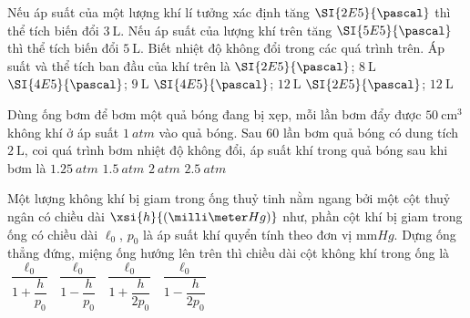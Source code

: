 \begin{ex}
Nếu áp suất của một lượng khí lí tưởng xác định tăng $\SI{2E5}{\pascal}$ thì thể tích biến đổi $\SI{3}{\liter}$. Nếu áp suất của lượng khí trên tăng $\SI{5E5}{\pascal}$ thì thể tích biến đổi $\SI{5}{\liter}$. Biết nhiệt độ không đổi trong các quá trình trên. Áp suất và thể tích ban đầu của khí trên là	
	\choice
	{$\SI{2E5}{\pascal}$; $\SI{8}{\liter}$}
	{\True $\SI{4E5}{\pascal}$; $\SI{9}{\liter}$}
	{$\SI{4E5}{\pascal}$; $\SI{12}{\liter}$}
	{$\SI{2E5}{\pascal}$; $\SI{12}{\liter}$}
\end{ex}
\begin{ex}
Dùng ống bơm để bơm một quả bóng đang bị xẹp, mỗi lần bơm đẩy được $\SI{50}{\centi\meter^3}$ không khí ở áp suất $\SI{1}{atm}$ vào quả bóng. Sau 60 lần bơm quả bóng có dung tích $\SI{2}{\liter}$, coi quá trình bơm nhiệt độ không đổi, áp suất khí trong quả bóng sau khi bơm là	
	\choice
	{$\SI{1.25}{atm}$}
	{\True $\SI{1.5}{atm}$}
	{$\SI{2}{atm}$}
	{$\SI{2.5}{atm}$}
\end{ex}
\begin{ex}
Một lượng không khí bị giam trong ống thuỷ tinh nằm ngang bởi một cột thuỷ ngân có chiều dài $\xsi{h}{\left(\milli\meter Hg\right)}$ như, phần cột khí bị giam trong ống có chiều dài $\ell_0$, $p_0$ là áp suất khí quyển tính theo đơn vị $\si{\milli\meter Hg}$. Dựng ống thẳng đứng, miệng ống hướng lên trên thì chiều dài cột không khí trong ống là
	\choice
	{\True $\dfrac{\ell_0}{1+\dfrac{h}{p_0}}$}
	{$\dfrac{\ell_0}{1-\dfrac{h}{p_0}}$}
	{$\dfrac{\ell_0}{1+\dfrac{h}{2p_0}}$}
	{$\dfrac{\ell_0}{1-\dfrac{h}{2p_0}}$}
\end{ex}


